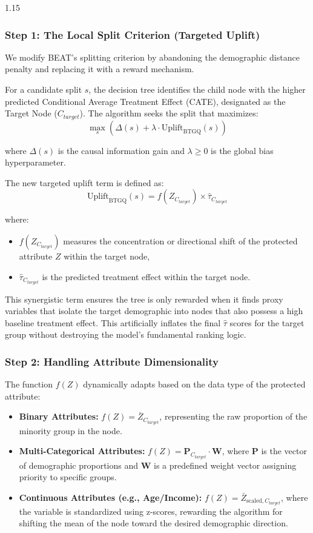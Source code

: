 \documentclass[11pt, a4paper]{article}
\begin{document}
\begin{spacing}{1.15}
\subsubsection*{Step 1: The Local Split Criterion (Targeted Uplift)}
We modify BEAT's splitting criterion by abandoning the demographic distance penalty and replacing it with a reward mechanism. 

For a candidate split $s$, the decision tree identifies the child node with the higher predicted Conditional Average Treatment Effect (CATE), designated as the Target Node ($C_{target}$). The algorithm seeks the split that maximizes:
$$ \max_{s} \left( \Delta(s) + \lambda \cdot \text{Uplift}_{\text{BTGQ}}(s) \right) $$

where $\Delta(s)$ is the causal information gain and $\lambda \ge 0$ is the global bias hyperparameter.

The new targeted uplift term is defined as:
$$ \text{Uplift}_{\text{BTGQ}}(s) = f(Z_{C_{target}}) \times \hat{\tau}_{C_{target}} $$

where:
\begin{itemize}
    \item $f(Z_{C_{target}})$ measures the concentration or directional shift of the protected attribute $Z$ within the target node,
    \item $\hat{\tau}_{C_{target}}$ is the predicted treatment effect within the target node.
\end{itemize}

This synergistic term ensures the tree is only rewarded when it finds proxy variables that isolate the target demographic into nodes that also possess a high baseline treatment effect. This artificially inflates the final $\hat{\tau}$ scores for the target group without destroying the model's fundamental ranking logic.

\subsubsection*{Step 2: Handling Attribute Dimensionality}
The function $f(Z)$ dynamically adapts based on the data type of the protected attribute:
\begin{itemize}
    \item \textbf{Binary Attributes:} $f(Z) = \bar{Z}_{C_{target}}$, representing the raw proportion of the minority group in the node.
    \item \textbf{Multi-Categorical Attributes:} $f(Z) = \mathbf{P}_{C_{target}} \cdot \mathbf{W}$, where $\mathbf{P}$ is the vector of demographic proportions and $\mathbf{W}$ is a predefined weight vector assigning priority to specific groups.
    \item \textbf{Continuous Attributes (e.g., Age/Income):} $f(Z) = \bar{Z}_{\text{scaled}, C_{target}}$, where the variable is standardized using z-scores, rewarding the algorithm for shifting the mean of the node toward the desired demographic direction.
\end{itemize}


\end{spacing}
\end{document}
